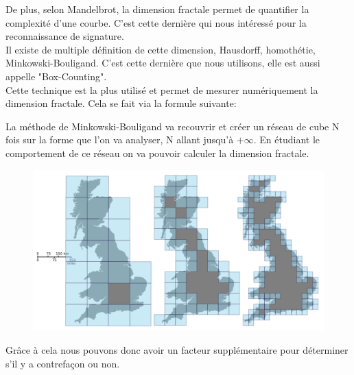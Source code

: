 \documentclass[pdftex,12pt,a4paper]{report}
\begin{document}
De plus, selon Mandelbrot, la dimension fractale permet de quantifier la complexité d'une courbe. C'est cette dernière qui nous intéressé pour la reconnaissance de signature.\\

Il existe de multiple définition de cette dimension, Hausdorff, homothétie, Minkowski-Bouligand. C'est cette dernière que nous utilisons, elle est aussi appelle "Box-Counting".\\

Cette technique est la plus utilisé et permet de mesurer numériquement la dimension fractale. Cela se fait via la formule suivante:

\vspace{0.3cm}
\begin{center}
\end{center}
\vspace{0.3cm}

La méthode de Minkowski-Bouligand va recouvrir et créer un réseau de cube N fois sur la forme que l'on va analyser, N allant jusqu'à $+\infty$. En étudiant le comportement de ce réseau on va pouvoir calculer la dimension fractale.\\

\begin{figure}[!h]
	\begin{center}
		\includegraphics[scale=0.28]{images/Great_Britain_Box.png}
	\end{center}
\end{figure}

Grâce à cela nous pouvons donc avoir un facteur supplémentaire pour déterminer s'il y a contrefaçon ou non.
\end{document}
